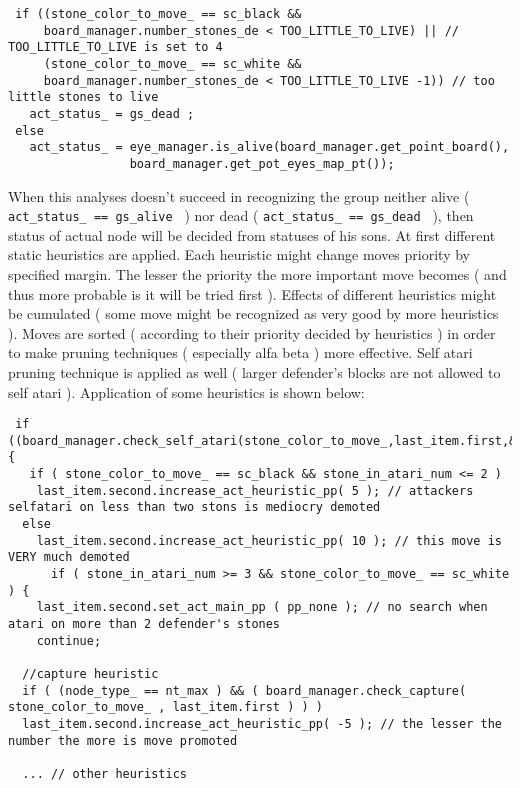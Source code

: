 \footnotesize\begin{verbatim} if ((stone_color_to_move_ == sc_black && 
     board_manager.number_stones_de < TOO_LITTLE_TO_LIVE) || // TOO_LITTLE_TO_LIVE is set to 4   
     (stone_color_to_move_ == sc_white && 
     board_manager.number_stones_de < TOO_LITTLE_TO_LIVE -1)) // too little stones to live 
   act_status_ = gs_dead ;
 else 
   act_status_ = eye_manager.is_alive(board_manager.get_point_board(), 
                 board_manager.get_pot_eyes_map_pt());
\end{verbatim}
\normalsize


When this analyses doesn't succeed in recognizing the group neither alive ( {\tt  act\_\-status\_\- == gs\_\-alive } ) nor dead ( {\tt  act\_\-status\_\- == gs\_\-dead } ), then status of actual node will be decided from statuses of his sons. At first different static heuristics are applied. Each heuristic might change moves priority by specified margin. The lesser the priority the more important move becomes ( and thus more probable is it will be tried first ). Effects of different heuristics might be cumulated ( some move might be recognized as very good by more heuristics ). Moves are sorted ( according to their priority decided by heuristics ) in order to make pruning techniques ( especially alfa beta ) more effective. Self atari pruning technique is applied as well ( larger defender's blocks are not allowed to self atari ). Application of some heuristics is shown below:



\footnotesize\begin{verbatim} if ((board_manager.check_self_atari(stone_color_to_move_,last_item.first,&stone_in_atari_num))) {
   if ( stone_color_to_move_ == sc_black && stone_in_atari_num <= 2 ) 
    last_item.second.increase_act_heuristic_pp( 5 ); // attackers selfatari on less than two stons is mediocry demoted
  else 
    last_item.second.increase_act_heuristic_pp( 10 ); // this move is VERY much demoted 
      if ( stone_in_atari_num >= 3 && stone_color_to_move_ == sc_white ) {
    last_item.second.set_act_main_pp ( pp_none ); // no search when atari on more than 2 defender's stones 
    continue;

  //capture heuristic
  if ( (node_type_ == nt_max ) && ( board_manager.check_capture( stone_color_to_move_ , last_item.first ) ) ) 
  last_item.second.increase_act_heuristic_pp( -5 ); // the lesser the number the more is move promoted
    
  ... // other heuristics 
\end{verbatim}
\normalsize


